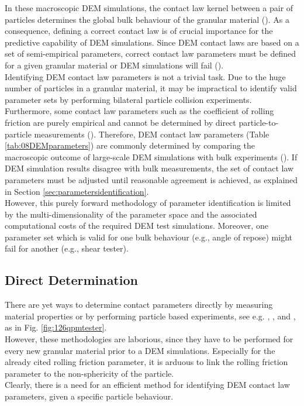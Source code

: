 In these macroscopic \acs{DEM} simulations, the contact law kernel between a 
pair of particles determines the global bulk behaviour of the granular material
(\citet{RefWorks:131}).
As a consequence, defining a correct contact law is of crucial importance for the predictive 
capability of \acs{DEM} simulations. 
Since \acs{DEM} contact laws are based 
on a set of semi-empirical parameters, correct contact law 
parameters must be defined for a given granular material
or \acs{DEM} simulations will fail (\citet{RefWorks:177}). \\
Identifying \acs{DEM} contact law parameters is not a trivial task. 
Due to the huge number of particles in a granular material, it
may be impractical to identify valid parameter sets by performing bilateral 
particle collision experiments. 
Furthermore, some contact law parameters such as the coefficient of rolling
friction are purely empirical and cannot be determined by direct 
particle-to-particle measurements (\citet{RefWorks:87}).
Therefore, \acs{DEM} contact law parameters (Table \ref{tab:08DEMparameters}) are
commonly determined by comparing the macroscopic outcome of large-scale \acs{DEM}
simulations with bulk experiments (\citet{RefWorks:91}). 
If \acs{DEM} simulation results disagree with bulk measurements, the set of contact
law parameters must be adjusted until reasonable agreement is achieved, as
explained in Section \ref{sec:parametersidentification}.\\
However, this purely forward methodology of parameter identification is limited by 
the multi-dimensionality of the parameter space and the associated computational costs of the required 
\acs{DEM} test simulations. 
Moreover, one parameter set which is valid for one bulk behaviour (e.g., angle
of repose) might fail for another (e.g., shear tester). \\

\subsection{Direct Determination}
\label{subsec:directdetermination}


There are yet ways to determine contact parameters directly by measuring
material properties or by performing particle based experiments, see e.g.
\citet{RefWorks:177}, \citet{RefWorks:181}, and \citet{RefWorks:186}, as in
Fig. \ref{fig:126qpmtester}.\\
However, these methodologies are laborious, 
since they have to be performed for every new granular material prior to a \acs{DEM}
simulations. 
Especially for the already cited rolling friction parameter, it is arduous to
link the rolling friction parameter to the non-sphericity of the particle. \\
Clearly, there is a
need for an efficient method for identifying \acs{DEM} contact law parameters, given
a specific particle behaviour.




